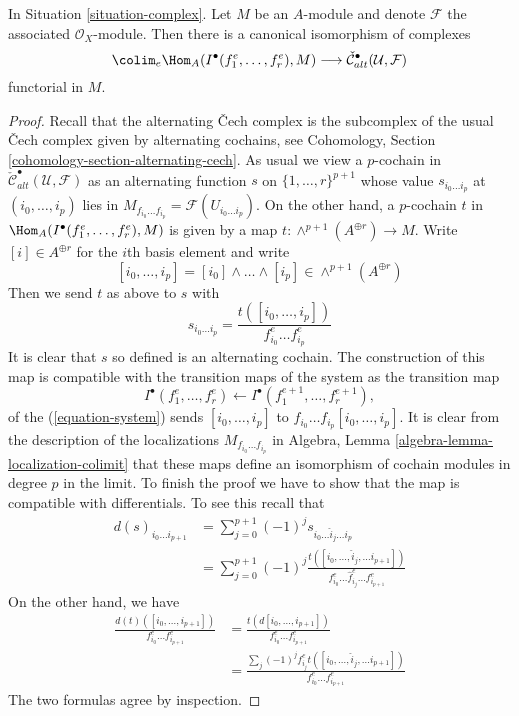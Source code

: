 \begin{lemma}
\label{lemma-alternating-cech-complex}
In Situation \ref{situation-complex}. Let $M$ be an $A$-module and
denote $\mathcal{F}$ the associated $\mathcal{O}_X$-module. Then
there is a canonical isomorphism of complexes
$$
\colim_e \Hom_A(I^\bullet(f_1^e, \ldots, f_r^e), M)
\longrightarrow
\check{\mathcal{C}}_{alt}^\bullet(\mathcal{U}, \mathcal{F})
$$
functorial in $M$.
\end{lemma}

\begin{proof}
Recall that the alternating {\v C}ech complex is the subcomplex
of the usual {\v C}ech complex given by alternating cochains, see
Cohomology, Section \ref{cohomology-section-alternating-cech}.
As usual we view a $p$-cochain in
$\check{\mathcal{C}}_{alt}^\bullet(\mathcal{U}, \mathcal{F})$
as an alternating function $s$ on $\{1, \ldots, r\}^{p + 1}$
whose value $s_{i_0\ldots i_p}$ at $(i_0, \ldots, i_p)$ lies in
$M_{f_{i_0}\ldots f_{i_p}} = \mathcal{F}(U_{i_0\ldots i_p})$.
On the other hand, a $p$-cochain $t$ in
$\Hom_A(I^\bullet(f_1^e, \ldots, f_r^e), M)$
is given by a map $t : \wedge^{p + 1}(A^{\oplus r}) \to M$.
Write $[i] \in A^{\oplus r}$ for the $i$th basis element and
write
$$
[i_0, \ldots, i_p] = [i_0] \wedge \ldots \wedge [i_p]
\in \wedge^{p + 1}(A^{\oplus r})
$$
Then we send $t$ as above to $s$ with
$$
s_{i_0\ldots i_p} = \frac{t([i_0, \ldots, i_p])}{f_{i_0}^e\ldots f_{i_p}^e}
$$
It is clear that $s$ so defined is an alternating cochain.
The construction of this map is compatible with the transition maps
of the system as the transition map
$$
I^\bullet(f_1^e, \ldots, f_r^e) \leftarrow
I^\bullet(f_1^{e + 1}, \ldots, f_r^{e + 1}),
$$
of the (\ref{equation-system}) sends $[i_0, \ldots, i_p]$
to $f_{i_0}\ldots f_{i_p}[i_0, \ldots, i_p]$.
It is clear from the description of the localizations
$M_{f_{i_0}\ldots f_{i_p}}$ in
Algebra, Lemma \ref{algebra-lemma-localization-colimit}
that these maps define an isomorphism of cochain modules in degree $p$
in the limit. To finish the proof we have to show that the map
is compatible with differentials. To see this recall that
\begin{align*}
d(s)_{i_0\ldots i_{p + 1}}
& =
\sum\nolimits_{j = 0}^{p + 1} (-1)^j
s_{i_0\ldots \hat i_j \ldots i_p} \\
& = 
\sum\nolimits_{j = 0}^{p + 1} (-1)^j
\frac{t([i_0, \ldots, \hat i_j, \ldots i_{p + 1}])}
{f_{i_0}^e\ldots \hat f_{i_j}^e \ldots f_{i_{p + 1}}^e}
\end{align*}
On the other hand, we have
\begin{align*}
\frac{d(t)([i_0, \ldots, i_{p + 1}])}{f_{i_0}^e\ldots f_{i_{p + 1}}^e}
& =
\frac{t(d[i_0, \ldots, i_{p + 1}])}{f_{i_0}^e\ldots f_{i_{p + 1}}^e} \\
& =
\frac{\sum_j (-1)^j f_{i_j}^e t([i_0, \ldots, \hat i_j, \ldots i_{p + 1}])}
{f_{i_0}^e \ldots f_{i_{p + 1}}^e}
\end{align*}
The two formulas agree by inspection.
\end{proof}

